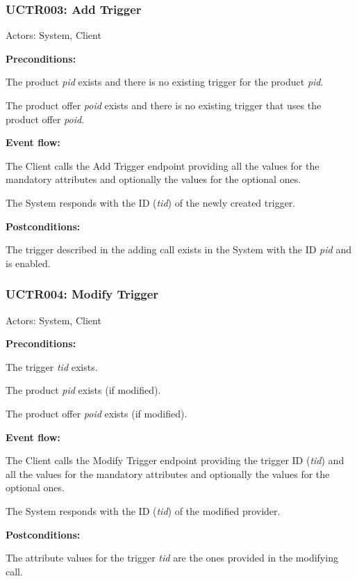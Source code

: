 \begin{ucbox}{\subsubsection{UCTR003: Add Trigger}}
\label{UCTR003}

Actors: System, Client

\textbf{Preconditions:}

\ucitem The product \textit{pid} exists and there is no existing trigger for the product \textit{pid}.

\ucitem The product offer \textit{poid} exists and there is no existing trigger that uses the product offer \textit{poid}.

\textbf{Event flow:}

\ucitem The Client calls the Add Trigger endpoint providing all the values for the mandatory attributes and optionally the values for the optional ones.

\ucitem The System responds with the ID (\textit{tid}) of the newly created trigger.

\textbf{Postconditions:}

\ucitem The trigger described in the adding call exists in the System with the ID \textit{pid} and is enabled.

\end{ucbox}

\begin{ucbox}{\subsubsection{UCTR004: Modify Trigger}}
\label{UCTR004}

Actors: System, Client

\textbf{Preconditions:}

\ucitem The trigger \textit{tid} exists.

\ucitem The product \textit{pid} exists (if modified).

\ucitem The product offer \textit{poid} exists (if modified).

\textbf{Event flow:}

\ucitem The Client calls the Modify Trigger endpoint providing the trigger ID (\textit{tid}) and all the values for the mandatory attributes and optionally the values for the optional ones.

\ucitem The System responds with the ID (\textit{tid}) of the modified provider.

\textbf{Postconditions:}

\ucitem The attribute values for the trigger \textit{tid} are the ones provided in the modifying call.

\end{ucbox}

